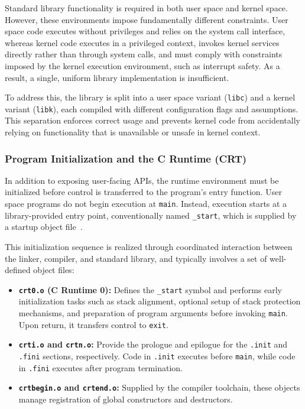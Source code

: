 \documentclass[a4paper,10pt,twoside]{report}
\theoremstyle{definition}
\begin{document}
Standard library functionality is required in both user space and kernel space. However, these environments impose fundamentally different constraints. User space code executes without privileges and relies on the system call interface, whereas kernel code executes in a privileged context, invokes kernel services directly rather than through system calls, and must comply with constraints imposed by the kernel execution environment, such as interrupt safety. As a result, a single, uniform library implementation is insufficient.

To address this, the library is split into a user space variant (\texttt{libc}) and a kernel variant (\texttt{libk}), each compiled with different configuration flags and assumptions. This separation enforces correct usage and prevents kernel code from accidentally relying on functionality that is unavailable or unsafe in kernel context.

\subsubsection{Program Initialization and the C Runtime (CRT)}
\label{subsubsec:theory_crt}

In addition to exposing user-facing APIs, the runtime environment must be initialized before control is transferred to the program's entry function. User space programs do not begin execution at \texttt{main}. Instead, execution starts at a library-provided entry point, conventionally named \texttt{\_start}, which is supplied by a startup object file~\cite{osdev_crt}.

This initialization sequence is realized through coordinated interaction between the linker, compiler, and standard library, and typically involves a set of well-defined object files:

\begin{itemize}
    \item \textbf{\texttt{crt0.o} (C Runtime 0):} Defines the \texttt{\_start} symbol and performs early initialization tasks such as stack alignment, optional setup of stack protection mechanisms, and preparation of program arguments before invoking \texttt{main}. Upon return, it transfers control to \texttt{exit}.
    
    \item \textbf{\texttt{crti.o} and \texttt{crtn.o}:} Provide the prologue and epilogue for the \texttt{.init} and \texttt{.fini} sections, respectively. Code in \texttt{.init} executes before \texttt{main}, while code in \texttt{.fini} executes after program termination.
    
    \item \textbf{\texttt{crtbegin.o} and \texttt{crtend.o}:} Supplied by the compiler toolchain, these objects manage registration of global constructors and destructors.
\end{itemize}
\end{document}
